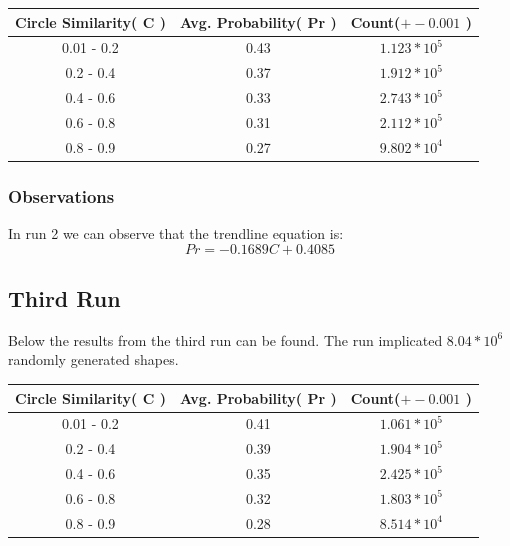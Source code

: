 \documentclass[9pt,onecolumn,oneside]{osajnl}
\begin{document}
\begin{table}[h!]
\centering
 \begin{tabular}{||c c c||} 
 \hline
 Circle Similarity( C ) & Avg. Probability( Pr ) & Count(\(+-0.001\) )\\ [0.5ex] 
 \hline\hline
 0.01 - 0.2 & 0.43 & \(1.123*10^{5}\)\\ 
 0.2 - 0.4 & 0.37 & \(1.912*10^{5}\)\\
 0.4 - 0.6 & 0.33 & \(2.743*10^{5}\)\\
 0.6 -  0.8 & 0.31 & \(2.112*10^{5}\)\\
 0.8 - 0.9 & 0.27 & \(9.802*10^{4}\)\\ 
 \hline
\end{tabular}
\end{table}

\begin{center}
\end{center}


\subsubsection{Observations}

	In run 2 we can observe that the trendline equation is:
\[Pr = -0.1689C + 0.4085\]

\subsection{Third Run}

	Below the results from the third run can be found. The run implicated \(8.04*10^{6}\) randomly generated shapes. 


\begin{table}[h!]
\centering
 \begin{tabular}{||c c c||} 
 \hline
 Circle Similarity( C ) & Avg. Probability( Pr ) & Count(\(+-0.001\) )\\ [0.5ex] 
 \hline\hline
 0.01 - 0.2 & 0.41 & \(1.061*10^{5}\)\\ 
 0.2 - 0.4 & 0.39 & \(1.904*10^{5}\)\\
 0.4 - 0.6 & 0.35 & \(2.425*10^{5}\)\\
 0.6 -  0.8 & 0.32 & \(1.803*10^{5}\)\\
 0.8 - 0.9 & 0.28 & \(8.514*10^{4}\)\\ 
 \hline
\end{tabular}
\end{table}
\end{document}
